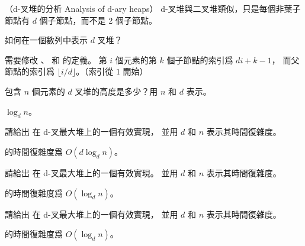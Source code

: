 \startPROBLEM[problem:6-2]
（d-叉堆的分析 Analysis of d-ary heaps）
d-叉堆與二叉堆類似，只是每個非葉子節點有 $d$ 個子節點，而不是 2 個子節點。

\startigBase[a]\startitem
如何在一個數列中表示 $d$ 叉堆？
\stopitem\stopigBase

\startANSWER
需要修改 、  和  的定義。
第 $i$ 個元素的第 $k$ 個子節點的索引爲 $di + k - 1$，
而父節點的索引爲 $\lfloor i/d \rfloor$。（索引從 $1$ 開始）
\stopANSWER

\startigBase[continue]\startitem
包含 $n$ 個元素的 $d$ 叉堆的高度是多少？用 $n$ 和 $d$ 表示。
\stopitem\stopigBase

\startANSWER
$\log_d{n}$。
\stopANSWER

\startigBase[continue]\startitem
請給出  在 d-叉最大堆上的一個有效實現，
並用 $d$ 和 $n$ 表示其時間復雜度。
\stopitem\stopigBase

\startANSWER
{} 的時間復雜度爲 $O(d\log_d{n})$。
\stopANSWER

\startigBase[continue]\startitem
請給出  在 d-叉最大堆上的一個有效實現。
並用 $d$ 和 $n$ 表示其時間復雜度。
\stopitem\stopigBase

\startANSWER
{} 的時間復雜度爲 $O(\log_d{n})$。
\stopANSWER

\startigBase[continue]\startitem
請給出  在 d-叉最大堆上的一個有效實現，
並用 $d$ 和 $n$ 表示其時間復雜度。
\stopitem\stopigBase

\startANSWER
{} 的時間復雜度爲 $O(\log_d{n})$。
\stopANSWER

\stopPROBLEM
